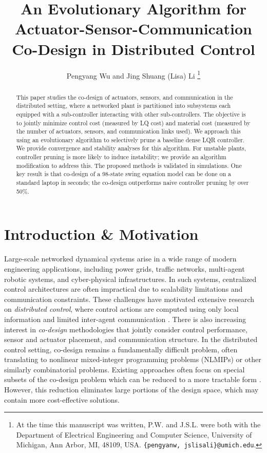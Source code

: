 \documentclass[letterpaper, 10pt, conference]{ieeeconf}
\begin{document}
\newcommand{\Red}[1]{\textcolor{red}{[{#1}]}}

\title{\LARGE \bf
An Evolutionary Algorithm for Actuator-Sensor-Communication Co-Design in Distributed Control
}
\author{Pengyang Wu and Jing Shuang (Lisa) Li%
\thanks{At the time this manuscript was written, P.W. and J.S.L. were both with the Department of Electrical Engineering and Computer Science, University of Michigan, Ann Arbor, MI, 48109, USA.
        {\tt\small \{pengyanw, jslisali\}@umich.edu}.    }%
}

\maketitle

\begin{abstract}
This paper studies the co-design of actuators, sensors, and communication in the distributed setting, where a networked plant is partitioned into subsystems each equipped with a sub-controller interacting with other sub-controllers. The objective is to jointly minimize control cost (measured by LQ cost) and material cost (measured by the number of actuators, sensors, and communication links used). We approach this using an evolutionary algorithm to selectively prune a baseline dense LQR controller. We provide convergence and stability analyses for this algorithm. For unstable plants, controller pruning is more likely to induce instability; we provide an algorithm modification to address this. The proposed methods is validated in simulations. One key result is that co-design of a 98-state swing equation model can be done on a standard laptop in seconds; the co-design outperforms naive controller pruning by over 50\%.
\end{abstract}

\section{Introduction \& Motivation}
Large-scale networked dynamical systems arise in a wide range of modern engineering applications, including power grids, traffic networks, multi-agent robotic systems, and cyber-physical infrastructures. In such systems, centralized control architectures are often impractical due to scalability limitations and communication constraints. These challenges have motivated extensive research on \emph{distributed control}, where control actions are computed using only local information and limited inter-agent communication \cite{9535262, anderson2019system, shin}. There is also increasing interest in \emph{co-design} methodologies that jointly consider control performance, sensor and actuator placement, and communication structure. In the distributed control setting, co-design remains a fundamentally difficult problem, often translating to nonlinear mixed-integer programming problems (NLMIPs) or other similarly combinatorial problems. Existing approaches often focus on special subsets of the co-design problem which can be reduced to a more tractable form \cite{Pequito2015, Jiang2016, Moothedath2019, Singh2021}. However, this reduction eliminates large portions of the design space, which may contain more cost-effective solutions. 
\end{document}
